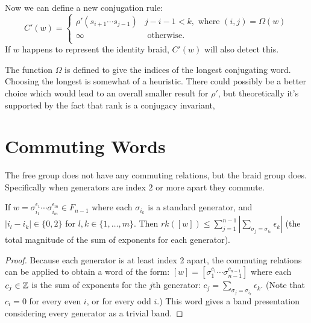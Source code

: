 \documentclass[12pt]{thesis}
\begin{document}
Now we can define a new conjugation rule:
\begin{equation}
    \label{modified-conjugation-rule}
    C'(w) = \begin{cases}
        \rho'(s_{i + 1} \cdots s_{j - 1}) & j - i - 1 < k, \text { where } (i, j) = \Omega(w) \\
               \infty & \text{ otherwise. } \\
          \end{cases}
\end{equation}
If $w$ happens to represent the identity braid, $C'(w)$ will also detect this.

The function $\Omega$ is defined to give the indices of the longest
conjugating word.
Choosing the longest is somewhat of a heuristic.
There could possibly be a better choice which would lead to an overall smaller result for $\rho'$,
but theoretically it's supported by the fact that rank is a conjugacy invariant,

\section{Commuting Words}

The free group does not have any commuting relations,
but the braid group does.
Specifically when generators are index $2$ or more apart they commute.

\begin{proposition}
    If $w = \sigma_{i_{1}}^{\epsilon_{1}} \cdots \sigma_{i_{m}}^{\epsilon_{m}} \in F_{n-1}$
    where each $\sigma_{i_{k}}$ is a standard generator,
    and $|i_{l} - i_{k}| \in \{ 0,  2 \}$ for $l, k \in \{ 1, \ldots, m \}$.
    Then $rk([w]) \leq \sum_{j=1}^{n-1} |\sum_{\sigma_{j} = \sigma_{i_{k}}} \epsilon_{k}|$ (the total magnitude
    of the sum of exponents for each generator).
\end{proposition}

\begin{proof}
    Because each generator is at least index 2 apart, 
    the commuting relations can be applied
    to obtain a word of the form: $[w] = [\sigma_{1}^{c_{1}} \cdots \sigma_{n-1}^{c_{n-1}}]$
    where each $c_{j} \in \mathbb{Z}$ is the sum of exponents for the $j$th generator: $c_{j} = \sum_{\sigma_{j} = \sigma_{i_{k}}} \epsilon_{k}$.
    (Note that $c_{i} = 0$ for every even $i$,
    or for every odd $i$.)
    This word gives a band presentation considering every
    generator as a trivial band. 
\end{proof}
\end{document}
